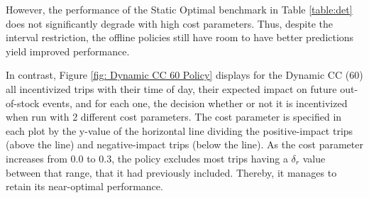 However, the performance of the Static Optimal benchmark in Table \ref{table:det} does not significantly degrade with high cost parameters. Thus, despite the interval restriction, the offline policies still have room to have better predictions yield improved performance.

In contrast, Figure \ref{fig: Dynamic CC 60 Policy} displays for the Dynamic CC (60) all incentivized trips with their time of day, their expected impact on future out-of-stock events, and for each one, the decision whether or not it is incentivized when run with 2 different cost parameters.%
The cost parameter is specified in each plot by the y-value of the horizontal line dividing the positive-impact trips (above the line) and negative-impact trips (below the line). As the cost parameter increases from 0.0 to 0.3, the policy excludes most trips having a $\delta_r$ value between that range, that it had previously included. Thereby, it manages to retain its near-optimal performance.





